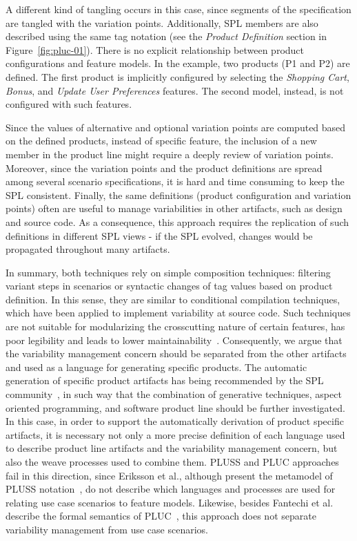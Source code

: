 \documentclass{acm_proc_article-sp}
\begin{document}
A different kind of tangling occurs in this case, since segments of the specification are tangled with the variation 
points. Additionally, SPL members are also described using the same tag notation (see the \emph{Product Definition} section 
in Figure~\ref{fig:pluc-01}). There is no explicit relationship between product configurations and feature models. In the example, 
two products (P1 and P2) are defined. The first product is implicitly configured by selecting the \emph{Shopping Cart}, 
\emph{Bonus}, and \emph{Update User Preferences} features. The second model, instead, is not configured 
with such features. 

Since the values of alternative and optional variation points are computed based on the defined products, instead 
of specific feature, the inclusion of a new member in the product line might require a deeply review of 
variation points. Moreover, since the variation points and the product definitions are spread among several scenario specifications, it is hard and time consuming to keep the SPL consistent. Finally, the same definitions (product configuration and variation points) often are useful to manage variabilities in other artifacts, such as design and source code. As a consequence, this approach requires the replication of such definitions in different SPL views - if the SPL evolved, changes would be propagated throughout many artifacts.

In summary, both techniques rely on simple composition techniques: filtering variant steps in scenarios or syntactic changes of tag values based on product definition. In this sense, they are similar to conditional compilation techniques, which have been applied to implement variability at source code. Such techniques are not suitable for modularizing the crosscutting nature of certain features, has poor legibility and leads to lower maintainability~\cite{alves-gpce-06}. 
Consequently, we argue that the variability management concern should be separated from the other artifacts and used as a language for generating specific products. The automatic generation of specific product artifacts has being recommended by the SPL community~\cite{krueger-cacm-200712,greenfield-softwarefactories,czarnecki-book}, in such way that the combination of generative techniques, aspect oriented programming, and software product line should be further investigated. In this case, in order to support the automatically derivation of product specific artifacts, it is necessary not only a more precise definition of each language used to describe product line artifacts and the variability management concern, but also the weave processes used to combine them. PLUSS and PLUC approaches fail in this direction, since Eriksson et al., although present the metamodel of PLUSS notation~\cite{eriksson-splc-2005}, do not describe which languages and processes are used for relating use case scenarios to feature models. Likewise, besides Fantechi et al. describe the formal semantics of PLUC~\cite{fantechi-splc-2004}, this approach does not separate variability management from use case scenarios.
\end{document}
